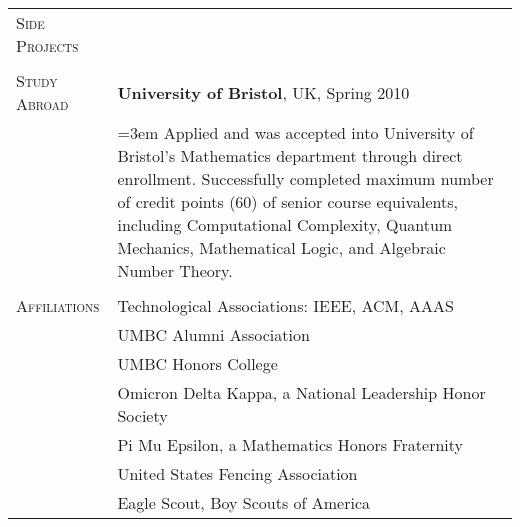 \begin{tabular}{l p{340pt}}
\textsc{Side Projects} & \\
& \\

\textsc{Study Abroad} & \textbf{University of Bristol}, UK, Spring 2010\\
& \hangindent=3em \hangafter=0  Applied and was accepted into University of Bristol's Mathematics department through direct enrollment.  Successfully completed maximum number of credit points (60) of senior course equivalents, including Computational Complexity, Quantum Mechanics, Mathematical Logic, and Algebraic Number Theory.\\
& \\


\textsc{Affiliations}
& Technological Associations: IEEE, ACM, AAAS\\
& UMBC Alumni Association\\
& UMBC Honors College\\
& Omicron Delta Kappa, a National Leadership Honor Society\\
& Pi Mu Epsilon, a Mathematics Honors Fraternity\\
& United States Fencing Association\\
& Eagle Scout, Boy Scouts of America\\
\end{tabular}
